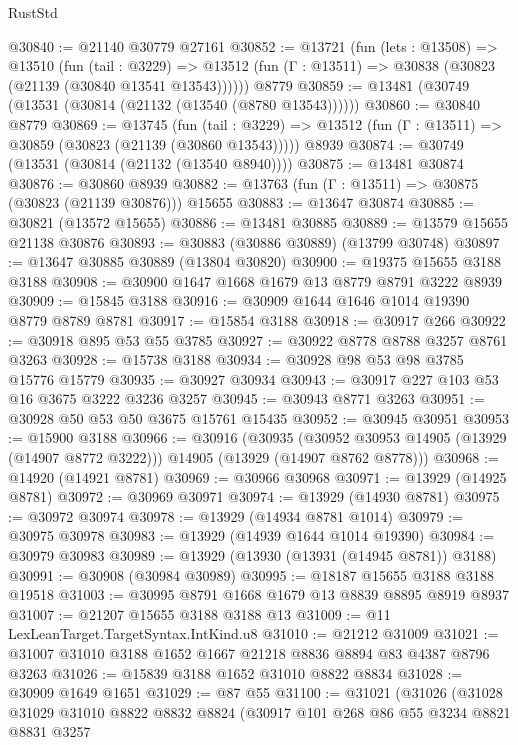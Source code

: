 \begin{lexlean}{RustStd}
\begin{coremodule}
@30840 := @21140 @30779 @27161
@30852 := @13721
    (fun (lets : @13508) =>
    @13510
      (fun (tail : @3229) =>
      @13512 (fun (Γ : @13511) => @30838 (@30823 (@21139 (@30840 @13541 @13543))))))
    @8779
@30859 := @13481 (@30749 (@13531 (@30814 (@21132 (@13540 (@8780 @13543))))))
@30860 := @30840 @8779
@30869 := @13745
    (fun (tail : @3229) => @13512 (fun (Γ : @13511) => @30859 (@30823 (@21139 (@30860 @13543)))))
    @8939
@30874 := @30749 (@13531 (@30814 (@21132 (@13540 @8940))))
@30875 := @13481 @30874
@30876 := @30860 @8939
@30882 := @13763 (fun (Γ : @13511) => @30875 (@30823 (@21139 @30876))) @15655
@30883 := @13647 @30874
@30885 := @30821 (@13572 @15655)
@30886 := @13481 @30885
@30889 := @13579 @15655 @21138 @30876
@30893 := @30883 (@30886 @30889) (@13799 @30748)
@30897 := @13647 @30885 @30889 (@13804 @30820)
@30900 := @19375 @15655 @3188 @3188
@30908 := @30900 @1647 @1668 @1679 @13 @8779 @8791 @3222 @8939
@30909 := @15845 @3188
@30916 := @30909 @1644 @1646 @1014 @19390 @8779 @8789 @8781
@30917 := @15854 @3188
@30918 := @30917 @266
@30922 := @30918 @895 @53 @55 @3785
@30927 := @30922 @8778 @8788 @3257 @8761 @3263
@30928 := @15738 @3188
@30934 := @30928 @98 @53 @98 @3785 @15776 @15779
@30935 := @30927 @30934
@30943 := @30917 @227 @103 @53 @16 @3675 @3222 @3236 @3257
@30945 := @30943 @8771 @3263
@30951 := @30928 @50 @53 @50 @3675 @15761 @15435
@30952 := @30945 @30951
@30953 := @15900 @3188
@30966 := @30916
    (@30935
      (@30952 @30953 @14905 (@13929 (@14907 @8772 @3222)))
      @14905
      (@13929 (@14907 @8762 @8778)))
@30968 := @14920 (@14921 @8781)
@30969 := @30966 @30968
@30971 := @13929 (@14925 @8781)
@30972 := @30969 @30971
@30974 := @13929 (@14930 @8781)
@30975 := @30972 @30974
@30978 := @13929 (@14934 @8781 @1014)
@30979 := @30975 @30978
@30983 := @13929 (@14939 @1644 @1014 @19390)
@30984 := @30979 @30983
@30989 := @13929 (@13930 (@13931 (@14945 @8781)) @3188)
@30991 := @30908 (@30984 @30989)
@30995 := @18187 @15655 @3188 @3188 @19518
@31003 := @30995 @8791 @1668 @1679 @13 @8839 @8895 @8919 @8937
@31007 := @21207 @15655 @3188 @3188 @13
@31009 := @11 LexLeanTarget.TargetSyntax.IntKind.u8
@31010 := @21212 @31009
@31021 := @31007 @31010 @3188 @1652 @1667 @21218 @8836 @8894 @83 @4387 @8796 @3263
@31026 := @15839 @3188 @1652 @31010 @8822 @8834
@31028 := @30909 @1649 @1651
@31029 := @87 @55
@31100 := @31021
    (@31026
      (@31028
        @31029
        @31010
        @8822
        @8832
        @8824
        (@30917
          @101
          @268
          @86
          @55
          @3234
          @8821
          @8831
          @3257

\end{coremodule}
\end{lexlean}
